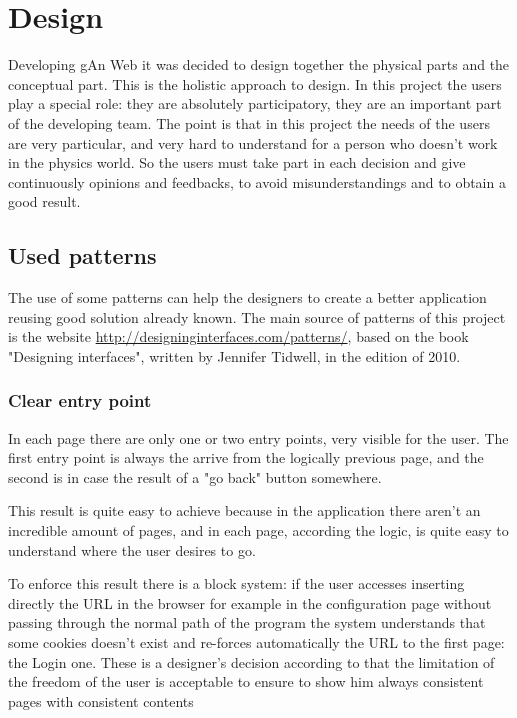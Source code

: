 
\chapter{Design} %

\label{Chapter6} %

Developing gAn Web it was decided to design together the physical parts and the conceptual part. This is the holistic approach to design. In this project the users play a special role: they are absolutely participatory, they are an important part of the developing team.
The point is that in this project the needs of the users are very particular, and very hard to understand for a person who doesn't work in the physics world. So the users must take part in each decision and give continuously opinions and feedbacks, to avoid misunderstandings and to obtain a good result.

\section{Used patterns}

The use of some patterns can help the designers to create a better application reusing good solution already known.
The main source of patterns of this project is the website \url{http://designinginterfaces.com/patterns/}, based on the book "Designing interfaces", written by Jennifer Tidwell, in the edition of 2010.

\subsection{Clear entry point} 

In each page there are only one or two entry points, very visible for the user.
The first entry point is always the arrive from the logically previous page, and the second is in case the result of a "go back" button somewhere.

This result is quite easy to achieve because in the application there aren't an incredible amount of pages, and in each page, according the logic, is quite easy to understand where the user desires to go. 

To enforce this result there is a block system: if the user accesses inserting directly the URL in the browser for example in the configuration page without passing through the normal path of the program the system understands that some cookies doesn't exist and re-forces automatically the URL to the first page: the Login one. These is a designer's decision according to that the limitation of the freedom of the user is acceptable to ensure to show him always consistent pages with consistent contents

